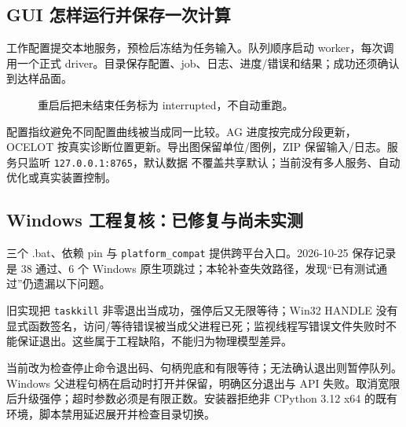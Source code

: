 \subsection{GUI 怎样运行并保存一次计算}
工作配置提交本地服务，预检后冻结为任务输入。队列顺序启动 worker，每次调用一个正式 driver。目录保存配置、job、日志、进度/错误和结果；成功还须确认到达样品面。
\begin{figure}[H]\centering
{}\caption{重启后把未结束任务标为 interrupted，不自动重跑。}\end{figure}

配置指纹避免不同配置曲线被当成同一比较。AG 进度按完成分段更新，OCELOT 按真实诊断位置更新。导出图保留单位/图例，ZIP 保留输入/日志。服务只监听 \texttt{127.0.0.1:8765}，默认数据  不覆盖共享默认；当前没有多人服务、自动优化或真实装置控制。

\subsection{Windows 工程复核：已修复与尚未实测}
三个 .bat、依赖 pin 与 \texttt{platform\_compat} 提供跨平台入口。2026-10-25 保存记录是 38 通过、6 个 Windows 原生项跳过；本轮补查失效路径，发现“已有测试通过”仍遗漏以下问题。

旧实现把 \texttt{taskkill} 非零退出当成功，强停后又无限等待；Win32 HANDLE 没有显式函数签名，访问/等待错误被当成父进程已死；监视线程写错误文件失败时不能保证退出。这些属于工程缺陷，不能归为物理模型差异。

当前改为检查停止命令退出码、句柄兜底和有限等待；无法确认退出则暂停队列。Windows 父进程句柄在启动时打开并保留，明确区分退出与 API 失败。取消宽限后升级强停；超时参数必须是有限正数。安装器拒绝非 CPython 3.12 x64 的既有环境，脚本禁用延迟展开并检查目录切换。

